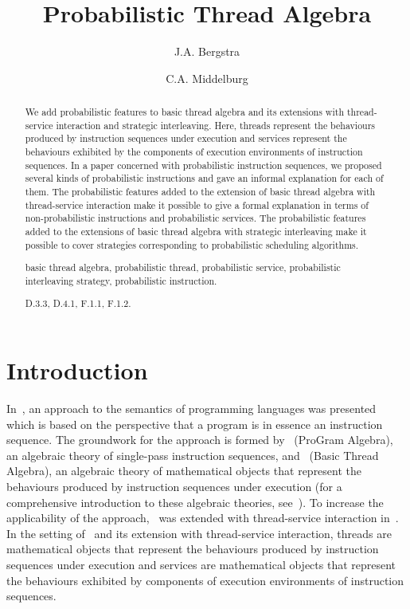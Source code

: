 \documentclass{llncs}
\title{Probabilistic Thread Algebra}
\author{J.A. Bergstra \and C.A. Middelburg}
\institute{Informatics Institute, Faculty of Science, University of
           Amsterdam, \\
           Science Park~904, 1098~XH Amsterdam, the Netherlands \\
           \email{J.A.Bergstra@uva.nl,C.A.Middelburg@uva.nl}}
\begin{document}
\maketitle

\begin{abstract}
We add probabilistic features to basic thread algebra and its extensions 
with thread-service interaction and strategic interleaving.
Here, threads represent the behaviours produced by instruction sequences 
under execution and services represent the behaviours exhibited by the 
components of execution environments of instruction sequences.
In a paper concerned with probabilistic instruction sequences, we 
proposed several kinds of probabilistic instructions and gave an 
informal explanation for each of them.
The probabilistic features added to the extension of basic thread 
algebra with thread-service interaction make it possible to give a 
formal explanation in terms of non-probabilistic instructions and 
probabilistic services.
The probabilistic features added to the extensions of basic thread 
algebra with strategic interleaving make it possible to cover strategies
corresponding to probabilistic scheduling algorithms.
\begin{keywords} 
basic thread algebra, probabilistic thread, probabilistic service,
probabilistic interleaving strategy, probabilistic instruction.
\end{keywords}\begin{classcode}
D.3.3, D.4.1, F.1.1, F.1.2.
\end{classcode}
\end{abstract}

\section{Introduction}
\label{sect-intro}

In~\cite{BL02a}, an approach to the semantics of programming languages 
was presented which is based on the perspective that a program is in 
essence an instruction sequence.
The groundwork for the approach is formed by \PGA\ (ProGram Algebra), 
an algebraic theory of single-pass instruction sequences, and \BTA\ 
(Basic Thread Algebra), an algebraic theory of mathematical objects that 
represent the behaviours produced by instruction sequences under 
execution (for a comprehensive introduction to these algebraic theories, 
see~\cite{BM12b}).
To increase the applicability of the approach, \BTA\ was extended with
thread-service interaction in~\cite{BP02a}.
In the setting of \BTA\ and its extension with thread-service 
interaction, threads are mathematical objects that represent the 
behaviours produced by instruction sequences under execution and 
services are mathematical objects that represent the behaviours 
exhibited by components of execution environments of instruction 
sequences.
\end{document}
